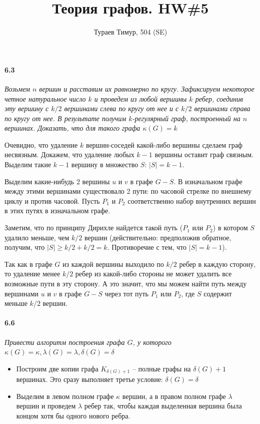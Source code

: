 \documentclass[russian]{article}
\begin{document}
\title{Теория графов. HW\#5}
\author{Тураев Тимур, 504 (SE)}

\maketitle

\paragraph{6.3} \textit{Возьмем $n$ вершин и расставим их равномерно по кругу. Зафиксируем некоторое четное натуральное число $k$ и проведем из любой вершины $k$ ребер, соединив эту вершину с $k/2$ вершинами слева по кругу от нее и с $k/2$ вершинами справа по кругу от нее. В результате получим $k$-регулярный граф, построенный на $n$ вершинах. Доказать, что для такого графа $\kappa(G) = k$}

Очевидно, что удаление $k$ вершин-соседей какой-либо вершины сделаем граф несвязным.
Докажем, что удаление любых $k-1$ вершины оставит граф связным. Выделим такие $k-1$ вершину в множество $S$: $|S| = k-1$.

Выделим какие-нибудь 2 вершины $u$ и $v$ в графе $G-S$. В изначальном графе между этими вершинами существовало 2 пути: по часовой стрелке по внешнему циклу и против часовой. Пусть $P_1$ и $P_2$ соответственно набор внутренних вершин в этих путях в изначальном графе.

Заметим, что по принципу Дирихле найдется такой путь ($P_1$ или $P_2$) в котором $S$ удалило меньше, чем $k/2$ вершин (действительно: предположив обратное, получим, что $|S| \geqslant k/2 + k/2 = k$. Противоречие с тем, что $|S| = k-1$).

Так как в графе $G$ из каждой вершины выходило по $k/2$ ребер в каждую сторону, то удаление менее $k/2$ ребер из какой-либо стороны не может удалить все возможные пути в эту сторону. А это значит, что мы можем найти путь между вершинами $u$ и $v$ в графе $G-S$ через тот путь $P_1$ или $P_2$, где $S$ содержит меньше $k/2$ вершин.

\paragraph{6.6} \textit{Привести алгоритм построения графа $G$, у которого $\kappa(G) = \kappa, \lambda(G) = \lambda, \delta(G) = \delta$}

\begin{itemize}
\item Построим две копии графа $K_{\delta(G)+1}$ -- полные графы на $\delta(G)+1$ вершинах. Это сразу выполняет третье условие: $\delta(G) = \delta$

\item Выделим в левом полном графе $\kappa$ вершин, а в правом полном графе $\lambda$ вершин и проведем $\lambda$ ребер так, чтобы каждая выделенная вершина была концом хотя бы одного нового ребра.
\end{itemize}
\end{document}

